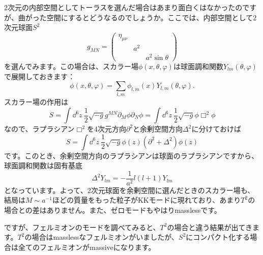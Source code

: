 \documentclass[unicode,a4paper,11pt]{ltjsarticle}
\begin{document}
2次元の内部空間としてトーラスを選んだ場合はあまり面白くはなかったのですが、曲がった空間にするとどうなるのでしょうか。ここでは、内部空間として2次元球面$S^{2}$
\begin{equation}
   g_{MN}
   =
   \begin{pmatrix}
      \eta_{\mu\nu} &     &               \\
                    & a^2 &               \\
                    &     & a^2\sin\theta
   \end{pmatrix}
\end{equation}
を選んでみます。この場合は、スカラー場$\phi(x,\theta,\varphi)$は球面調和関数$Y_{lm}(\theta,\varphi)$で展開しておきます：
\begin{equation}
   \phi(x,\theta,\varphi)
   =
   \sum_{l,m}\phi_{l,m}(x)Y_{l,m}(\theta,\varphi)
   .
\end{equation}
スカラー場の作用は
\begin{equation}
   S
   =
   \int\dd^6 z\ 
   \frac{1}{2}\sqrt{-g}g^{MN}\partial_{M}\phi\partial_{N}\phi
   =
   \int\dd^6 z\ 
   \frac{1}{2}\sqrt{-g}\phi\Box^{2}\phi
\end{equation}
なので、ラプラシアン$\Box^{2}$を4次元方向$\partial^2$と余剰空間方向$\Delta^2$に分けておけば
\begin{equation}
   S
   =
   \int\dd^6 z\ 
   \frac{1}{2}\sqrt{-g}
   \phi(z)
   (\partial^{2}+\Delta^2)
   \phi(z)
\end{equation}
です。このとき、余剰空間方向のラプラシアンは球面のラプラシアンですから、球面調和関数は固有基底
\begin{equation}
   \Delta^2 Y_{lm}
   =
   -\frac{1}{a^2}l(l+1) Y_{lm}
\end{equation}
となっています。よって、2次元球面を余剰空間に選んだときのスカラー場も、結局は$M\sim a^{-1}$ほどの質量をもった粒子がKKモードに現れており、あまり$T^{2}$の場合との差はありません。また、ゼロモードもやはりmasslessです。

ですが、フェルミオンのモードを調べてみると、$T^2$の場合と違う結果が出てきます。$T^2$の場合はmasslessなフェルミオンがいましたが、$S^{2}$にコンパクト化する場合は全てのフェルミオンがmassiveになります。
\end{document}
